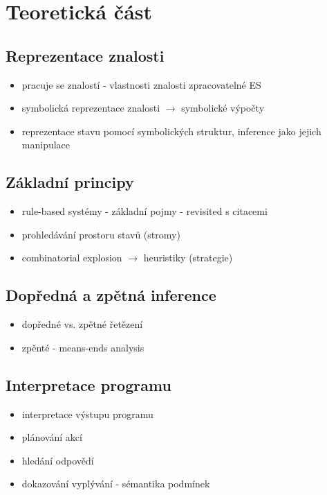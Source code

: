 \section{Teoretická část}


\subsection{Reprezentace znalosti}
\begin{framed}
  \begin{itemize}
    \item pracuje se znalostí - vlastnosti znalosti zpracovatelné ES
    \item symbolická reprezentace znalosti $\rightarrow$ symbolické výpočty
      \item reprezentace stavu pomocí symbolických struktur, inference jako jejich manipulace
  \end{itemize}
\end{framed}

\subsection{Základní principy}
\begin{framed}
  \begin{itemize}
    \item rule-based systémy - základní pojmy - revisited s citacemi
    \item prohledávání prostoru stavů (stromy)
    \item combinatorial explosion $\rightarrow$ heuristiky (strategie)
  \end{itemize}
\end{framed}

\subsection{Dopředná a zpětná inference}
\begin{framed}
  \begin{itemize}
    \item dopředné vs. zpětné řetězení
    \item zpěnté - means-ends analysis
  \end{itemize}
\end{framed}

\subsection{Interpretace programu}
\begin{framed}
  \begin{itemize}
    \item interpretace výstupu programu
    \item plánování akcí
    \item hledání odpovědí
    \item dokazování vyplývání - sémantika podmínek
  \end{itemize}
\end{framed}

